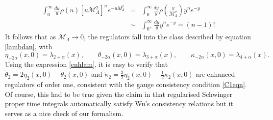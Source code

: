 \documentclass[11pt, letter]{article}
\def\be{\begin{equation}}
\def\ee{\end{equation}}
\newcommand{\M}{\mathcal{M}}
\begin{document}
\begin{eqnarray}
\int_0^\infty  \frac{du}{u} \rho(u) [u\M_\Lambda^2]^{n} e^{-u M_\Lambda^2} &=& \int_0^\infty  \frac{dy}{y} \rho\left(\frac{y}{\M_\Lambda^2}\right) y^{n} e^{-y} \\
&\sim & \int_{0^+}^\infty  \frac{dy}{y}  y^{n} e^{-y} =(n-1)!
\end{eqnarray}
It follows that as $\M_\Lambda \to 0$, the regulators fall into the class described by equation \eqref{lambdan}, with
\be \label{SPTregs}
\eta_{-2\alpha}(x, 0)=\lambda_{2+\alpha}(x), \qquad \theta_{-2\alpha}(x, 0)=\lambda_{3+\alpha}(x), \qquad \kappa_{-2\alpha}(x, 0)=\lambda_{4+\alpha}(x).
\ee
Using the expression \eqref{enhlam}, it is easy to verify that  $\tilde \theta_2=2\eta_{2}(x, 0)-\theta_{2}(x, 0)$  and  $\tilde \kappa_2=\frac32\eta_{2}(x, 0)-\frac12\kappa_{2}(x, 0)$ are enhanced regulators of order one, consistent with the gauge consistency condition \eqref{C1eqn}.  Of course,  this had to be true given the claim in \cite{Xing:2022jtt} that regularised Schwinger proper time integrals automatically satisfy Wu's consistency relations but it serves as a nice check of our formalism.
\end{document}
